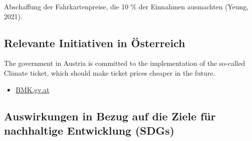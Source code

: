 \documentclass[
]{book}
\providecommand{\tightlist}{%
  \setlength{\itemsep}{0pt}\setlength{\parskip}{0pt}}
\begin{document}
Abschaffung der Fahrkartenpreise, die 10 \% der Einnahmen ausmachten (Yeung, 2021).

\hypertarget{relevante-initiativen-in-uxf6sterreich-23}{%
\subsection*{Relevante Initiativen in Österreich}\label{relevante-initiativen-in-uxf6sterreich-23}}

The government in Austria is committed to the implementation of the so-called Climate ticket, which should make ticket prices cheaper in the future.

\begin{itemize}
\tightlist
\item
  \href{https://www.bmk.gv.at/themen/mobilitaet/1-2-3-ticket.html}{BMK.gv.at}
\end{itemize}

\hypertarget{auswirkungen-in-bezug-auf-die-ziele-fuxfcr-nachhaltige-entwicklung-sdgs-23}{%
\subsection*{Auswirkungen in Bezug auf die Ziele für nachhaltige Entwicklung (SDGs)}\label{auswirkungen-in-bezug-auf-die-ziele-fuxfcr-nachhaltige-entwicklung-sdgs-23}}
\end{document}

